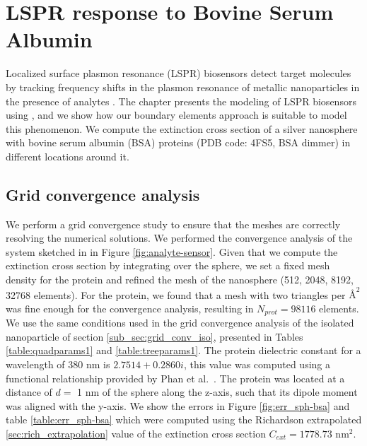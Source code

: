 \section{LSPR response to Bovine Serum Albumin} \label{chap:lspr_response_bsa}

Localized surface plasmon resonance (LSPR) biosensors detect target molecules
by tracking frequency shifts in the plasmon resonance of metallic nanoparticles
in the presence of analytes \cite{WilletsVandyune2007}. The chapter presents the 
modeling of LSPR biosensors using \pygbe, and we show how our boundary elements approach is 
suitable to model this phenomenon. We compute the extinction cross section 
of a silver nanosphere with bovine serum albumin (BSA) proteins (PDB code: 4FS5,
BSA dimmer) in different locations around it. 


\subsection{Grid convergence analysis} \label{sec:grid_conv_bsa}
We perform a grid convergence study to ensure that the meshes are correctly
resolving the numerical solutions. We performed the convergence analysis of
the system sketched in in Figure \ref{fig:analyte-sensor}. Given that we 
compute the extinction cross section by integrating over the sphere, we set 
a fixed mesh density for the protein and refined the mesh of the nanosphere 
(512, 2048, 8192, 32768 elements). For the protein, we found that a mesh with
two triangles per $\text{\AA}^2$ was fine enough for the convergence 
analysis, resulting in $N_{prot} = 98116$ elements.
We use the same conditions used in the grid convergence analysis of the 
isolated nanoparticle of section \ref{sub_sec:grid_conv_iso}, presented
in Tables \ref{table:quadparams1} and \ref{table:treeparams1}. The protein 
dielectric constant for a wavelength of 380 nm is $2.7514 + 0.2860i$, this  
value was computed using a functional relationship provided by Phan
 et al.~\cite{PhanETal2013}. The protein was located at a distance of 
 $d=$ 1 nm of the sphere along the z-axis, such that its dipole moment 
 was aligned with the y-axis. We show the errors in Figure  \ref{fig:err_sph-bsa} 
 and table \ref{table:err_sph-bsa} which were computed using the Richardson extrapolated
\ref{sec:rich_extrapolation} value of the extinction cross section $C_{ext}= 1778.73$ nm$^2$.

